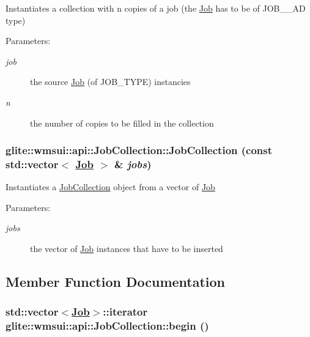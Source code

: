Instantiates a collection with n copies of a job (the \hyperlink{classglite_1_1wmsui_1_1api_1_1Job}{Job} has to be of JOB\_\-\_\-AD type) \begin{Desc}
\item[Parameters:]
\begin{description}
\item[{\em job}]the source \hyperlink{classglite_1_1wmsui_1_1api_1_1Job}{Job} (of JOB\_\-TYPE) instancies \item[{\em n}]the number of copies to be filled in the collection \end{description}
\end{Desc}
\hypertarget{classglite_1_1wmsui_1_1api_1_1JobCollection_z1_3}{
\subsubsection[JobCollection]{\setlength{\rightskip}{0pt plus 5cm}glite::wmsui::api::Job\-Collection::Job\-Collection (const std::vector$<$ \hyperlink{classglite_1_1wmsui_1_1api_1_1Job}{Job} $>$ \& {\em jobs})}}
\label{classglite_1_1wmsui_1_1api_1_1JobCollection_z1_3}


Instantiates a \hyperlink{classglite_1_1wmsui_1_1api_1_1JobCollection}{Job\-Collection} object from a vector of \hyperlink{classglite_1_1wmsui_1_1api_1_1Job}{Job} \begin{Desc}
\item[Parameters:]
\begin{description}
\item[{\em jobs}]the vector of \hyperlink{classglite_1_1wmsui_1_1api_1_1Job}{Job} instances that have to be inserted\end{description}
\end{Desc}


\subsection{Member Function Documentation}
\hypertarget{classglite_1_1wmsui_1_1api_1_1JobCollection_z5_0}{
\subsubsection[begin]{\setlength{\rightskip}{0pt plus 5cm}std::vector$<$\hyperlink{classglite_1_1wmsui_1_1api_1_1Job}{Job}$>$::iterator glite::wmsui::api::Job\-Collection::begin ()}}
\label{classglite_1_1wmsui_1_1api_1_1JobCollection_z5_0}


